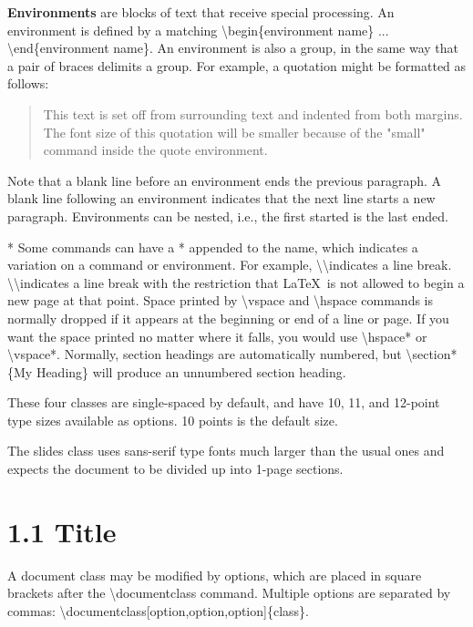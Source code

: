 \documentclass[12pt,openright]{book}
\begin{document}
\textbf{Environments} are blocks of text that receive special processing. An environment is
defined by a matching \textbackslash begin\{environment name\} ... \textbackslash end\{environment name\}. An environment is also a group, in the same way that a pair of braces delimits a group. For example, a quotation might be formatted as follows:

  \begin{quote}
  \small
  This text is set off from surrounding text and indented from
  both margins. The font size of this quotation will be smaller
  because of the "small" command inside the quote environment.
  \end{quote}

Note that a blank line before an environment ends the previous paragraph. A blank
line following an environment indicates that the next line starts a new paragraph.
Environments can be nested, i.e., the first started is the last ended.

* Some commands can have a * appended to the name, which indicates a variation on a
command or environment. For example, \textbackslash\textbackslash indicates a line break. \textbackslash\textbackslash* indicates a
line break with the restriction that \LaTeX\ is not allowed to begin a new page at that
point. Space printed by \textbackslash vspace and \textbackslash hspace commands is normally dropped if it appears at the beginning or end of a line or page. If you want the space printed no matter where it falls, you would use \textbackslash hspace* or \textbackslash vspace*. Normally, section headings are automatically numbered, but \textbackslash section*\{My Heading\} will produce an unnumbered section heading.


These four classes are single-spaced by default, and have 10, 11, and 12-point type sizes
available as options. 10 points is the default size.

The slides class uses sans-serif type fonts much larger than the usual ones and expects
the document to be divided up into 1-page sections.

\section{1.1 Title}

A document class may be modified by options, which are placed in square brackets after
the \textbackslash documentclass command. Multiple options are separated by commas:
\textbackslash documentclass[option,option,option]\{class\}.
\end{document}
